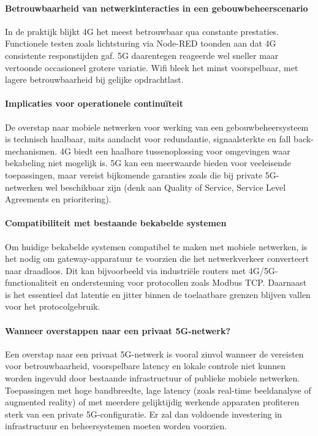 \paragraph{Betrouwbaarheid van netwerkinteracties in een gebouwbeheerscenario}
In de praktijk blijkt 4G het meest betrouwbaar qua constante prestaties. Functionele testen zoals lichtsturing via Node-RED toonden aan dat 4G consistente responstijden gaf. 5G daarentegen reageerde wel  sneller maar vertoonde occasioneel grotere variatie. Wifi bleek het minst voorspelbaar, met lagere betrouwbaarheid bij gelijke opdrachtlast.

\paragraph{Implicaties voor operationele continuïteit}
De overstap naar mobiele netwerken voor werking van een gebouwbeheersysteem is technisch haalbaar, mits aandacht voor redundantie, signaalsterkte en fall back-mechanismen. 4G biedt een haalbare tussenoplossing voor omgevingen waar bekabeling niet mogelijk is. 5G kan een meerwaarde bieden voor veeleisende toepassingen, maar vereist bijkomende garanties zoals die bij private 5G-netwerken wel beschikbaar zijn (denk aan Quality of Service, Service Level Agreements en prioritering).

\paragraph{Compatibiliteit met bestaande bekabelde systemen}
Om huidige bekabelde systemen compatibel te maken met mobiele netwerken, is het nodig om gateway-apparatuur te voorzien die het netwerkverkeer converteert naar draadloos. Dit kan bijvoorbeeld via industriële routers met 4G/5G-functionaliteit en ondersteuning voor protocollen zoals Modbus TCP. Daarnaast is het essentieel dat latentie en jitter binnen de toelaatbare grenzen blijven vallen voor het protocolgebruik.

\paragraph{Wanneer overstappen naar een privaat 5G-netwerk?}
Een overstap naar een privaat 5G-netwerk is vooral zinvol wanneer de vereisten voor betrouwbaarheid, voorspelbare latency en lokale controle niet kunnen worden ingevuld door bestaande infrastructuur of publieke mobiele netwerken. Toepassingen met hoge bandbreedte, lage latency (zoals real-time beeldanalyse of augmented reality) of met meerdere gelijktijdig werkende apparaten profiteren sterk van een private 5G-configuratie. Er zal dan voldoende investering in infrastructuur en beheersystemen moeten worden voorzien.


